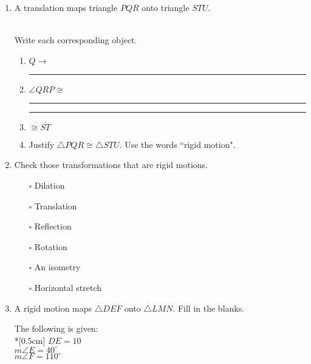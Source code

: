 \documentclass[12pt, twoside]{article}
\begin{document}
\begin{enumerate}
\item A translation maps triangle $PQR$ onto triangle $STU$. \vspace{0.5cm}
    \begin{multicols}{2}
      \\
      Write each corresponding object.
      \begin{enumerate}
        \item $Q \rightarrow$ \rule{2cm}{0.15mm}
        \item $\angle QRP \cong$ \rule{2cm}{0.15mm}
        \item \rule{2cm}{0.15mm} $\cong \overline {ST}$
        \item Justify $\triangle PQR \cong \triangle STU$. Use the words ``rigid motion".
      \end{enumerate}
    \end{multicols}  \vspace{2cm}

\item Check those transformations that are rigid motions.
    \begin{itemize}
      \item[$\square$] Dilation
      \item[$\square$] Translation
      \item[$\square$] Reflection
      \item[$\square$] Rotation
      \item[$\square$] An isometry
      \item[$\square$] Horizontal stretch
    \end{itemize}

\item A rigid motion maps $\triangle DEF$ onto $\triangle LMN$. Fill in the blanks. \vspace{0.5cm}
  \begin{multicols}{2}
    The following is given:\\*[0.5cm]
      $DE=10$ \\
      $m\angle E = 40^\circ$ \\
      $m\angle F = 110^\circ$ \\[0.5cm]
      \columnbreak
      

\end{multicols}
\end{enumerate}
\end{document}
